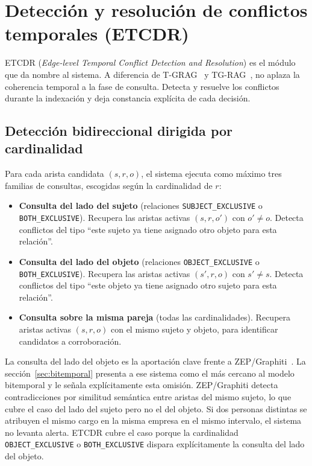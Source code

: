 \section{Detección y resolución de conflictos temporales (ETCDR)}\label{sec:bt-etcdr}

ETCDR (\emph{Edge-level Temporal Conflict Detection and Resolution}) es el módulo que da nombre al sistema. A diferencia de T-GRAG~\cite{tgrag2025} y TG-RAG~\cite{tg_rag2025}, no aplaza la coherencia temporal a la fase de consulta. Detecta y resuelve los conflictos durante la indexación y deja constancia explícita de cada decisión.

\subsection{Detección bidireccional dirigida por cardinalidad}

Para cada arista candidata $(s, r, o)$, el sistema ejecuta como máximo tres familias de consultas, escogidas según la cardinalidad de $r$:

\begin{itemize}
    \item \textbf{Consulta del lado del sujeto} (relaciones \texttt{SUBJECT\_EXCLUSIVE} o \texttt{BOTH\_EXCLUSIVE}). Recupera las aristas activas $(s, r, o')$ con $o' \neq o$. Detecta conflictos del tipo ``este sujeto ya tiene asignado otro objeto para esta relación''.
    \item \textbf{Consulta del lado del objeto} (relaciones \texttt{OBJECT\_EXCLUSIVE} o \texttt{BOTH\_EXCLUSIVE}). Recupera las aristas activas $(s', r, o)$ con $s' \neq s$. Detecta conflictos del tipo ``este objeto ya tiene asignado otro sujeto para esta relación''.
    \item \textbf{Consulta sobre la misma pareja} (todas las cardinalidades). Recupera aristas activas $(s, r, o)$ con el mismo sujeto y objeto, para identificar candidatos a corroboración.
\end{itemize}

La consulta del lado del objeto es la aportación clave frente a ZEP/Graphiti~\cite{zep2025}. La sección~\ref{sec:bitemporal} presenta a ese sistema como el más cercano al modelo bitemporal y le señala explícitamente esta omisión. ZEP/Graphiti detecta contradicciones por similitud semántica entre aristas del mismo sujeto, lo que cubre el caso del lado del sujeto pero no el del objeto. Si dos personas distintas se atribuyen el mismo cargo en la misma empresa en el mismo intervalo, el sistema no levanta alerta. ETCDR cubre el caso porque la cardinalidad \texttt{OBJECT\_EXCLUSIVE} o \texttt{BOTH\_EXCLUSIVE} dispara explícitamente la consulta del lado del objeto.

